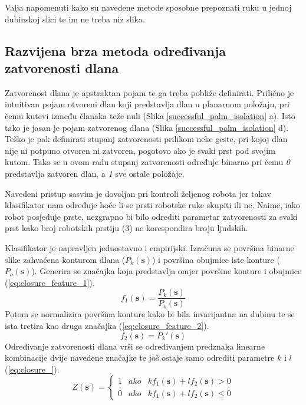 \documentclass[times, utf8, diplomski, numeric]{fer}
\begin{document}
Valja napomenuti kako su navedene metode sposobne prepoznati ruku u jednoj dubinskoj slici te im ne treba niz slika.

\subsection{Razvijena brza metoda određivanja zatvorenosti dlana} \label{brza-metoda}
Zatvorenost dlana je apstraktan pojam te ga treba pobliže definirati. Prilično je intuitivan pojam otvoreni dlan koji predstavlja dlan u planarnom položaju, pri čemu kutevi između članaka teže nuli (Slika \ref{successful_palm_isolation} a). Isto tako je jasan je pojam zatvorenog dlana (Slika \ref{successful_palm_isolation} d). Teško je pak definirati stupanj zatvorenosti prilikom neke geste, pri kojoj dlan nije ni potpuno otvoren ni zatvoren, pogotovo ako je svaki prst pod svojim kutom. Tako se u ovom radu stupanj zatvorenosti određuje binarno pri čemu \textit{0} predstavlja zatvoren dlan, a \textit{1} sve ostale položaje.

Navedeni pristup sasvim je dovoljan pri kontroli željenog robota jer takav klasifikator nam određuje hoće li se prsti robotske ruke skupiti ili ne. Naime, iako robot posjeduje prste, nezgrapno bi bilo odrediti parametar zatvorenosti za svaki prst kako broj robotskih prstiju (3) ne korespondira broju ljudskih.

Klasifikator je napravljen jednostavno i empirijski. Izračuna se površina binarne slike zahvaćena konturom dlana ($ P_{k}(\mathbf{s}) $) i površina obujmice iste konture ($ P_{o}(\mathbf{s}) $). Generira se značajka koja predstavlja omjer površine konture i obujmice (\ref{eq:closure_feature_1}).
\begin{equation}\label{eq:closure_feature_1}
f_{1}(\mathbf{s})=\frac{P_{k}(\mathbf{s})}{ P_{o}(\mathbf{s})} 
\end{equation}
Potom se normalizira površina konture kako bi bila invarijantna na dubinu te se ista tretira kao druga značajka (\ref{eq:closure_feature_2}).
\begin{equation}\label{eq:closure_feature_2}
f_{2}(\mathbf{s})={P_{k}}'(\mathbf{s}) 
\end{equation}
Određivanje zatvorenosti dlana vrši se određivanjem predznaka linearne kombinacije dvije navedene značajke te još ostaje samo odrediti parametre $k$ i $l$ (\ref{eq:closure_}).
\begin{equation}\label{eq:closure_}
Z(\mathbf{s})=\left\{\begin{matrix}
 1&  ako&kf_{1}(\mathbf{s})+lf_{2}(\mathbf{s})>0\\
 0& ako & kf_{1}(\mathbf{s})+lf_{2}(\mathbf{s})\leq 0
\end{matrix}\right.
\end{equation}
\end{document}
